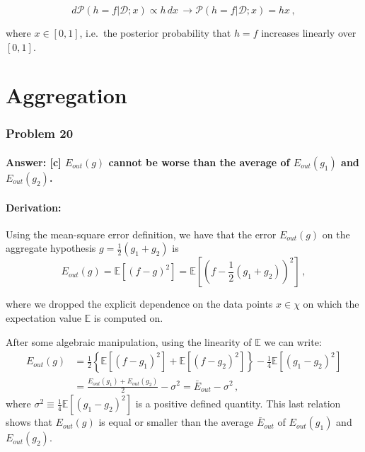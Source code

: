 \documentclass[11pt]{article}
\begin{document}
\begin{equation}
d\mathcal{P}(h=f|\mathcal{D};x)\propto h \,dx \,\rightarrow \mathcal{P}(h=f|\mathcal{D};x)=hx \,,
\end{equation}

where \(x\in[0,1]\), i.e.~the posterior probability that \(h=f\)
increases linearly over \([0,1]\).

    \hypertarget{aggregation}{%
\part{Aggregation}\label{aggregation}}

\hypertarget{problem-20}{%
\section{Problem 20}\label{problem-20}}

\hypertarget{answer-c-e_outg-cannot-be-worse-than-the-average-of-e_outg_1-and-e_outg_2.}{%
\subsection{\texorpdfstring{Answer: {[}c{]} \(E_{out}(g)\) cannot be
worse than the average of \(E_{out}(g_1)\) and
\(E_{out}(g_2)\).}{Answer: {[}c{]} E\_\{out\}(g) cannot be worse than the average of E\_\{out\}(g\_1) and E\_\{out\}(g\_2).}}\label{answer-c-e_outg-cannot-be-worse-than-the-average-of-e_outg_1-and-e_outg_2.}}

\hypertarget{derivation}{%
\subsection{Derivation:}\label{derivation}}

Using the mean-square error definition, we have that the error
\(E_{out}(g)\) on the aggregate hypothesis \(g=\frac{1}{2} (g_1+g_2)\)
is
\begin{equation}
E_{out}(g)=\mathbb{E}\left[\left(f-g\right)^2\right]=\mathbb{E}\left[\left(f-\frac{1}{2}(g_1+g_2)\right)^2\right]\,,
\end{equation}

where we dropped the explicit dependence on the data points \(x\in\chi\)
on which the expectation value \(\mathbb{E}\) is computed on.

After some algebraic manipulation, using the linearity of \(\mathbb{E}\)
we can write:
\begin{equation}
\begin{split}
E_{out}(g)&=\frac{1}{2}\left\{\mathbb{E}\left[\left(f-g_1\right)^2\right]+\mathbb{E}\left[\left(f-g_2\right)^2\right]\right\}-\frac{1}{4}\mathbb{E}\left[\left(g_1-g_2\right)^2\right]\\ &=\frac{E_{out}(g_1)+E_{out}(g_2)}{2}-\sigma^2=\bar{E}_{out}-\sigma^2\,,
\end{split}
\end{equation}
where
\(\sigma^2\equiv\frac{1}{4}\mathbb{E}\left[\left(g_1-g_2\right)^2\right]\)
is a positive defined quantity. This last relation shows that
\(E_{out}(g)\) is equal or smaller than the average \(\bar{E}_{out}\) of
\(E_{out}(g_1)\) and \(E_{out}(g_2)\).
\end{document}
